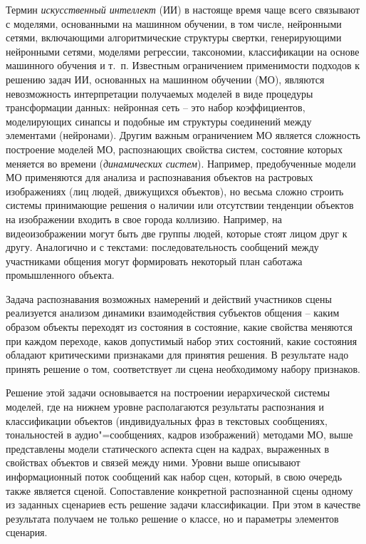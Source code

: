 \documentclass[12pt]{article}
\begin{document}
Термин \emph{искусственный интеллект} (ИИ) в настояще время чаще всего связывают с моделями, основанными на машинном обучении, в том числе, нейронными сетями, включающими алгоритмические структуры свертки, генерирующими нейронными сетями, моделями регрессии, таксономии, классификации на основе машинного обучения и т.~п. Известным ограничением применимости подходов к решению задач ИИ, основанных на машинном обучении (МО), являются невозможность интерпретации получаемых моделей в виде процедуры трансформации данных: нейронная сеть -- это набор коэффициентов, моделирующих синапсы и подобные им структуры соединений между элементами (нейронами). Другим важным ограничением МО является сложность построение моделей МО, распознающих свойства систем, состояние которых меняется во времени (\emph{динамических систем}). Например, предобученные модели МО применяются для анализа и распознавания объектов на растровых изображениях (лиц людей, движущихся объектов), но весьма сложно строить системы принимающие решения о наличии или отсутствии тенденции объектов на изображении входить в свое города коллизию. Например, на видеоизображении могут быть две группы людей, которые стоят лицом друг к другу. Аналогично и с текстами: последовательность сообщений между участниками общения могут формировать некоторый план саботажа промышленного объекта.

Задача распознавания возможных намерений и действий участников сцены реализуется анализом динамики взаимодействия субъектов общения -- каким образом объекты переходят из состояния в состояние, какие свойства меняются при каждом переходе, каков допустимый набор этих состояний, какие состояния обладают критическими признаками для принятия решения. В результате надо принять решение о том, соответствует ли сцена необходимому набору признаков.

Решение этой задачи основывается на построении иерархической системы моделей, где на нижнем уровне располагаются результаты распознания и классификации объектов (индивидуальных фраз в текстовых сообщениях, тональностей в аудио"=сообщениях, кадров изображений) методами МО, выше представлены модели статического аспекта сцен на кадрах, выраженных в свойствах объектов и связей между ними. Уровни выше описывают информационный поток сообщений как набор сцен, который, в свою очередь также является сценой. Сопоставление конкретной распознанной сцены одному из заданных сценариев есть решение задачи классификации. При этом в качестве результата получаем не только решение о классе, но и параметры элементов сценария.
\end{document}
